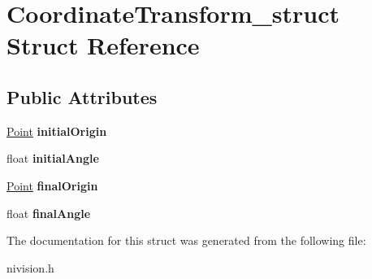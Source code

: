 \hypertarget{structCoordinateTransform__struct}{\section{\-Coordinate\-Transform\-\_\-struct \-Struct \-Reference}
\label{structCoordinateTransform__struct}
}
\subsection*{\-Public \-Attributes}
\begin{DoxyCompactItemize}
\item 
\hypertarget{structCoordinateTransform__struct_aef069d3dd5b11fa88c8c068cb5bb975a}{\hyperlink{structPoint__struct}{\-Point} {\bfseries initial\-Origin}}\label{structCoordinateTransform__struct_aef069d3dd5b11fa88c8c068cb5bb975a}

\item 
\hypertarget{structCoordinateTransform__struct_a55181d79cf0d1a88a3c553d05288adab}{float {\bfseries initial\-Angle}}\label{structCoordinateTransform__struct_a55181d79cf0d1a88a3c553d05288adab}

\item 
\hypertarget{structCoordinateTransform__struct_a46130a6771554d6652f099c944d0073e}{\hyperlink{structPoint__struct}{\-Point} {\bfseries final\-Origin}}\label{structCoordinateTransform__struct_a46130a6771554d6652f099c944d0073e}

\item 
\hypertarget{structCoordinateTransform__struct_a53dfa395fd10f7ee7fe8e76062603679}{float {\bfseries final\-Angle}}\label{structCoordinateTransform__struct_a53dfa395fd10f7ee7fe8e76062603679}

\end{DoxyCompactItemize}


\-The documentation for this struct was generated from the following file\-:\begin{DoxyCompactItemize}
\item 
nivision.\-h\end{DoxyCompactItemize}
